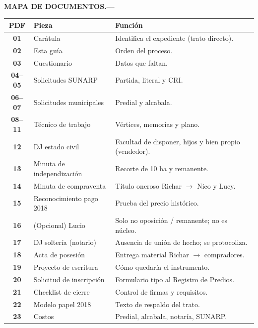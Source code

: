 \documentclass[12pt,a4paper]{article}
\begin{document}
\par\vspace{0.55em}
\noindent
\begin{minipage}[t]{0.24\linewidth}
\raggedright\textbf{\MakeUppercase{Mapa de documentos}.---}
\end{minipage}\hfill
\begin{minipage}[t]{0.74\linewidth}
{\footnotesize\renewcommand{\arraystretch}{1.12}
\noindent\begin{tabularx}{\linewidth}{@{} >{\bfseries}c >{\raggedright\arraybackslash}p{3.15cm} >{\raggedright\arraybackslash}X @{}}
\toprule
PDF & Pieza & Función \\
\midrule
01 & Carátula & Identifica el expediente (trato directo). \\
02 & Esta guía & Orden del proceso. \\
03 & Cuestionario & Datos que faltan. \\
04--05 & Solicitudes SUNARP & Partida, literal y CRI. \\
06--07 & Solicitudes municipales & Predial y alcabala. \\
08--11 & Técnico de trabajo & Vértices, memorias y plano. \\
12 & DJ estado civil & Facultad de disponer, hijos y bien propio (vendedor). \\
13 & Minuta de independización & Recorte de 10 ha y remanente. \\
14 & Minuta de compraventa & Título oneroso Richar $\rightarrow$ Nico y Lucy. \\
15 & Reconocimiento pago 2018 & Prueba del precio histórico. \\
16 & (Opcional) Lucio & Solo no oposición / remanente; no es núcleo. \\
17 & DJ soltería (notario) & Ausencia de unión de hecho; se protocoliza. \\
18 & Acta de posesión & Entrega material Richar $\rightarrow$ compradores. \\
19 & Proyecto de escritura & Cómo quedaría el instrumento. \\
20 & Solicitud de inscripción & Formulario tipo al Registro de Predios. \\
21 & Checklist de cierre & Control de firmas y requisitos. \\
22 & Modelo papel 2018 & Texto de respaldo del trato. \\
23 & Costos & Predial, alcabala, notaría, SUNARP. \\
\bottomrule
\end{tabularx}}
\end{minipage}
\par
\end{document}
